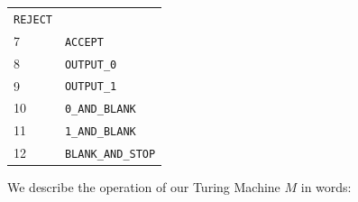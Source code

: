 \begin{longtable}[]{@{}ll@{}}
\begin{minipage}[t]{0.66\columnwidth}
\texttt{REJECT}\strut
\end{minipage}\tabularnewline
\begin{minipage}[t]{0.28\columnwidth}\raggedright
7\strut
\end{minipage} & \begin{minipage}[t]{0.66\columnwidth}\raggedright
\texttt{ACCEPT}\strut
\end{minipage}\tabularnewline
\begin{minipage}[t]{0.28\columnwidth}\raggedright
8\strut
\end{minipage} & \begin{minipage}[t]{0.66\columnwidth}\raggedright
\texttt{OUTPUT\_0}\strut
\end{minipage}\tabularnewline
\begin{minipage}[t]{0.28\columnwidth}\raggedright
9\strut
\end{minipage} & \begin{minipage}[t]{0.66\columnwidth}\raggedright
\texttt{OUTPUT\_1}\strut
\end{minipage}\tabularnewline
\begin{minipage}[t]{0.28\columnwidth}\raggedright
10\strut
\end{minipage} & \begin{minipage}[t]{0.66\columnwidth}\raggedright
\texttt{0\_AND\_BLANK}\strut
\end{minipage}\tabularnewline
\begin{minipage}[t]{0.28\columnwidth}\raggedright
11\strut
\end{minipage} & \begin{minipage}[t]{0.66\columnwidth}\raggedright
\texttt{1\_AND\_BLANK}\strut
\end{minipage}\tabularnewline
\begin{minipage}[t]{0.28\columnwidth}\raggedright
12\strut
\end{minipage} & \begin{minipage}[t]{0.66\columnwidth}\raggedright
\texttt{BLANK\_AND\_STOP}\strut
\end{minipage}\tabularnewline
\bottomrule
\end{longtable}

We describe the operation of our Turing Machine \(M\) in words:

